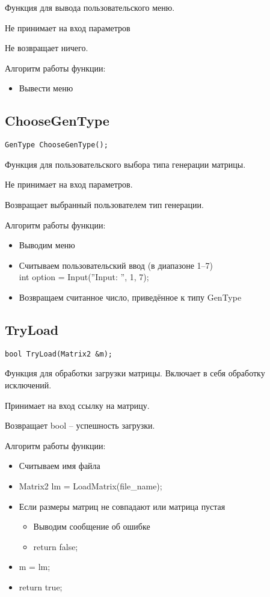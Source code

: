Функция для вывода пользовательского меню.

Не принимает на вход параметров

Не возвращает ничего.

Алгоритм работы функции:

\begin{itemize}
	\item Вывести меню
\end{itemize}

\subsection*{ChooseGenType}

\begin{lstlisting}[label={lst:ChooseGenType}]
	GenType ChooseGenType();
\end{lstlisting}

Функция для пользовательского выбора типа генерации матрицы.

Не принимает на вход параметров.

Возвращает выбранный пользователем тип генерации.

Алгоритм работы функции:

\begin{itemize}
	\item Выводим меню
	\item Считываем пользовательский ввод (в диапазоне 1--7)\\
	int option = Input(''Input: '', 1, 7);
	\item Возвращаем считанное число, приведённое к типу GenType
\end{itemize}

\subsection*{TryLoad}

\begin{lstlisting}[label={lst:TryLoad}]
	bool TryLoad(Matrix2 &m);
\end{lstlisting}

Функция для обработки загрузки матрицы.
Включает в себя обработку исключений.

Принимает на вход ссылку на матрицу.

Возвращает bool -- успешность загрузки.

Алгоритм работы функции:

\begin{itemize}
	\item Считываем имя файла
	\item Matrix2 lm = LoadMatrix(file\_name);
	\item Если размеры матриц не совпадают или матрица пустая
	\begin{itemize}
		\item Выводим сообщение об ошибке
		\item return false;
	\end{itemize}
	\item m = lm;
	\item return true;
\end{itemize}

